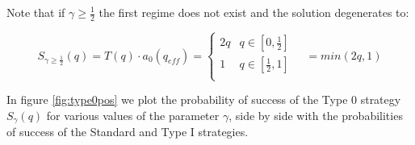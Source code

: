 \documentclass[letterpaper,12pt]{report}
\theoremstyle{plain}
\theoremstyle{definition}
\begin{document}
\noindent%
\begin{minipage}{\linewidth}
\label{fig:qcritical}
\end{minipage}
\linebreak

Note that if $\gamma\geq\frac{1}{2}$ the first regime does not exist and the solution degenerates to:

\begin{equation}\label{eq:sofq2}
S_{\gamma\geq\frac{1}{2}}(q)=T(q)\cdot a_0(q_{eff})=
\begin{cases}
2q & q\in [0,\frac{1}{2}] \\ 
1 & q\in [\frac{1}{2},1] \\ 
\end{cases} \quad = min(2q,1)
\end{equation}

In figure \ref{fig:type0pos} we plot the probability of success of the Type 0 strategy $S_\gamma(q)$ for various values of the parameter $\gamma$, side by side with the probabilities of success of the Standard and Type I strategies.
\end{document}
